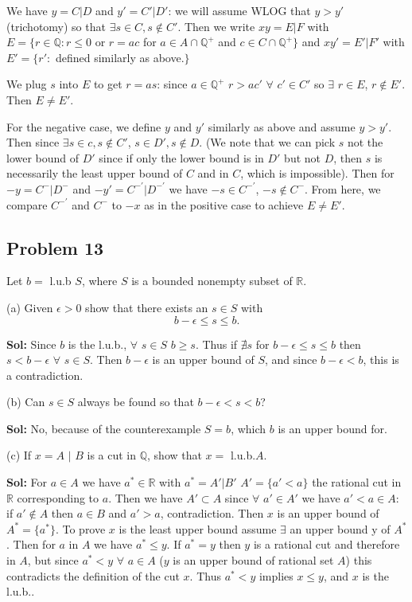 \documentclass{amsart}
\begin{document}
\medskip
\noindent We have $y = C|D$ and $y' = C'|D'$: we will assume WLOG that $y>y'$ (trichotomy) so that $\exists s\in C, s\notin C'$. Then we write
$xy = E|F$ with $E=\{r\in \mathbb{Q}: r\leq 0 $ or $r=ac$ for $a\in A\cap\mathbb{Q}^+$ and $c\in C\cap\mathbb{Q}^+\}$ and $xy'= E'|F'$ with $E'
= \{r' :$ defined similarly as above.$\}$ 

\medskip
\noindent We plug $s$ into $E$ to get $r = as$: since $a\in\mathbb{Q}^+$ $r>ac'$ $\forall$ $c'\in C'$ so $\exists$ $r\in E$, $r\notin E'$. Then 
$E\neq E'$.

\medskip
\noindent For the negative case, we define $y$ and $y'$ similarly as above and assume $y>y'$. Then since $\exists s\in c, s\notin C'$, $s\in D'
, s\notin D$. (We note that we can pick $s$ not the lower bound of $D'$ since if only the lower bound is in $D'$ but not $D$, then $s$ is necessarily
the least upper bound of $C$ and in $C$, which is impossible). Then for $-y= C^{-} | D^{-}$ and  $-y'=C^{-'} | D^{-'}$ we have $-s\in C^{-'}$, $-s\notin
C^{-}$. From here, we compare $C^{-'}$ and $C^{-}$ to $-x$ as in the positive case to achieve $E\neq E'$. 





\newpage
\subsection*{Problem 13}
\noindent Let $b = $ l.u.b $S$, where $S$ is a bounded nonempty subset of $\mathbb{R}$.

\indent (a) Given $\epsilon > 0$ show that there exists an $s\in S$ with $$b-\epsilon\leq s\leq b.$$

\medskip
\noindent \textbf{Sol:} Since $b$ is the l.u.b., $\forall$ $s\in S$ $b\geq s$. Thus if $\nexists s$ for $b-\epsilon\leq s\leq b$ then $s<b-\epsilon$ $\forall$
 $s\in S$. Then $b-\epsilon$ is an upper bound of $S$, and since $b-\epsilon<b$, this is a contradiction.

\bigskip

\indent (b) Can $s\in S$ always be found so that $b-\epsilon<s<b$?

\medskip
\noindent \textbf{Sol:} No, because of the counterexample $S = {b}$, which $b$ is an upper bound for. 

\bigskip

\indent (c) If $x=A$ $|$ $B$ is a cut in $\mathbb{Q}$, show that $x=$ l.u.b.$A$.

\medskip
\noindent \textbf{Sol:} For $a\in A$ we have $a^*\in\mathbb{R}$ with $a^* = A'|B'$ $A'=\{a'<a\}$ the rational cut in $\mathbb{R}$ corresponding to $a$. Then
we have $A'\subset A$ since $\forall$ $a'\in A'$ we have $a'<a\in A$: if $a'\notin A$ then $a\in B$ and $a'>a$, contradiction. Then $x$ is an
upper bound of $A^* = \{a^*\}$. To prove $x$ is the least upper bound assume $\exists$ an upper bound y of $A^*$. Then for $a$ in $A$ we have 
$a^*\leq y$. If $a^* = y$ then $y$ is a rational cut and therefore in $A$, but since $a^*<y$ $\forall$ $a\in A$ ($y$ is an upper bound
of rational set $A$) this contradicts the definition of the cut $x$. Thus $a^*<y$ implies $x\leq y$, and $x$ is the l.u.b..
\end{document}
